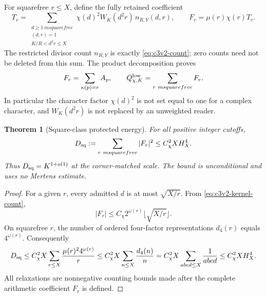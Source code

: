 \documentclass[11pt]{article}
\newtheorem{theorem}{Theorem}[section]
\theoremstyle{remark}
\begin{document}
For squarefree \(r\le X\), define the fully retained coefficient
\begin{equation}
 T_r=\sum_{\substack{d\ge1\ {
m squarefree}\\(d,r)=1\\
                              K/R<d^2r\le X}}
       \chi(d)^2 W_K(d^2r)\,n_{R,Y}(d,r),
 \qquad F_r=\mu(r)\chi(r)T_r.
 \label{eq:c3v3-Tr}
\end{equation}
The restricted divisor count \(n_{R,Y}\) is exactly
\eqref{eq:c3v2-count}; zero counts need not be deleted from this sum.
The product decomposition proves
\begin{equation}
 F_r=\sum_{\kappa(p)=r}A_p,\qquad
                 Q^{\rm low}_{\chi,K}=\sum_{r\ {
m squarefree}}F_r.
 \label{eq:c3v3-class-sum}
\end{equation}
In particular the character factor \(\chi(d)^2\) is not set equal
to one for a complex character, and \(W_K(d^2r)\) is not replaced
by an unweighted reader.

\begin{theorem}[Square-class protected energy]
\label{thm:c3v3-square-energy}
For all positive integer cutoffs,
\begin{equation}
 D_{\rm sq}:=\sum_{r\ {
m squarefree}}|F_r|^2
                          \le C_\chi^2 X H_X^4.
 \label{eq:c3v3-square-energy}
\end{equation}
Thus \(D_{\rm sq}=K^{1+o(1)}\) at the corner-matched scale.
The bound is unconditional and uses no Mertens estimate.
\end{theorem}

\begin{proof}
For a given \(r\), every admitted \(d\) is at most
\(\sqrt{X/r}\).  From \eqref{eq:c3v2-kernel-count},
\[
 |F_r|\le C_\chi 2^{\omega(r)}\lfloor\sqrt{X/r}\rfloor.
\]
On squarefree \(r\), the number of ordered four-factor
representations \(d_4(r)\) equals \(4^{\omega(r)}\).
Consequently
\[
 D_{\rm sq}\le C_\chi^2X
      \sum_{r\le X}\frac{\mu(r)^2 4^{\omega(r)}}r
 \le C_\chi^2X\sum_{n\le X}\frac{d_4(n)}n
 =C_\chi^2X\sum_{abcd\le X}\frac1{abcd}
 \le C_\chi^2XH_X^4.
\]
All relaxations are nonnegative counting bounds made after the
complete arithmetic coefficient \(F_r\) is defined.
\end{proof}
\end{document}
